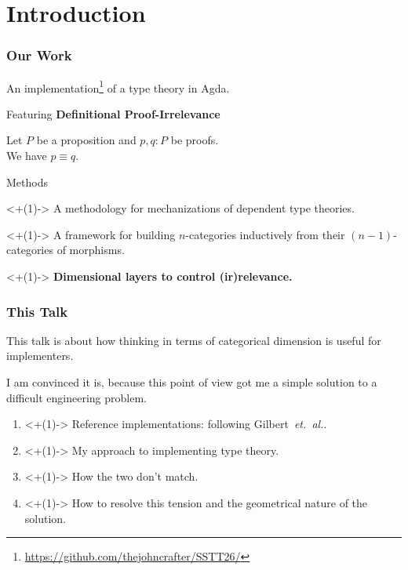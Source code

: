 \section{Introduction}

\begin{frame}
  \frametitle{Our Work}

  \pause An implementation\footnote{\url{https://github.com/thejohncrafter/SSTT26/}}
  of a type theory in Agda.

  \pause Featuring \textbf{Definitional Proof-Irrelevance}
  \begin{tightcenter}
    Let $P$ be a proposition and $p,q:P$ be proofs. \\
    We have $p≡q$.
  \end{tightcenter}

  \pause Methods
  \begin{tightitemize}
    \item<+(1)-> A methodology for mechanizations of dependent type
      theories.
    \item<+(1)-> A framework for building $n$-categories inductively from their
      $(n-1)$-categories of morphisms.
    \item<+(1)-> \textbf{Dimensional layers to control (ir)relevance.}
  \end{tightitemize}
\end{frame}

\begin{frame}
  \frametitle{This Talk}

  \pause This talk is about how thinking in terms of categorical dimension
  is useful for implementers.

  \pause I am convinced it is, because this point of view got me a simple
  solution to a difficult engineering problem.

  \begin{enumerate}
    \item<+(1)-> Reference implementations: following
      Gilbert~\textit{et.~al.}.
    \item<+(1)-> My approach to implementing type theory.
    \item<+(1)-> How the two don't match.
    \item<+(1)-> How to resolve this tension and the geometrical nature of the
      solution.
  \end{enumerate}
\end{frame}

